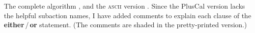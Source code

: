 The complete algorithm 
 , and 
the \textsc{ascii} version 
 .
Since the
PlusCal version lacks the helpful subaction names, I have added comments to
explain each clause of the \textbf{either}\,/\,\textbf{or} statement.
(The comments are shaded in the pretty-printed version.)
